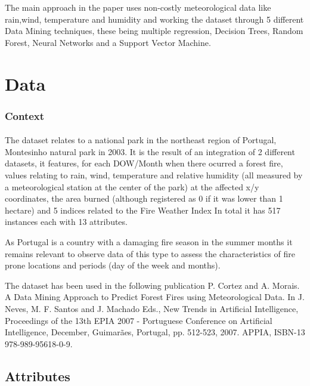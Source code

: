 \documentclass[runningheads]{llncs}
\begin{document}
The main approach in the paper uses non-costly meteorological data like rain,wind, temperature and  humidity and working the dataset through 5 different Data Mining techniques, these being multiple regression, Decision Trees, Random Forest, Neural Networks and a Support Vector Machine.
\break

\section{Data}
\subsubsection{Context}
\paragraph{}
The dataset relates to a national park in the northeast region of Portugal, Montesinho natural park\cite{montesinho} in 2003.
It is the result of an integration of 2 different datasets, it features, for each DOW/Month when there ocurred a forest fire, values relating to rain, wind, temperature and relative humidity (all measured by a meteorological station at the center of the park) at the affected x/y coordinates, the area burned (although registered as 0 if it was lower than 1 hectare) and 5 indices related to the Fire Weather Index\cite{fwi}
In total it has 517 instances each with 13 attributes.

As Portugal is a country with a damaging fire season in the summer months\cite{ptfire} it remains relevant to observe data of this type to assess the characteristics of fire prone locations and periods (day of the week and months).

The dataset has been used in the following publication  P. Cortez and A. Morais. A Data Mining Approach to Predict Forest Fires using Meteorological Data. In J. Neves, M. F. Santos and J. Machado Eds., New Trends in Artificial Intelligence, Proceedings of the 13th EPIA 2007 - Portuguese Conference on Artificial Intelligence, December, Guimarães, Portugal, pp. 512-523, 2007. APPIA, ISBN-13 978-989-95618-0-9.

\subsection{Attributes}
\paragraph{}
\end{document}
